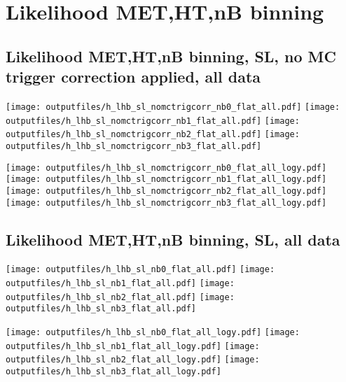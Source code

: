 \documentclass[11pt]{article}
\begin{document}




   \section{Likelihood MET,HT,nB binning}
    \subsection{ Likelihood MET,HT,nB binning, SL, no MC trigger correction applied, all data}

    \noindent
     \texttt{[image: outputfiles/h\_lhb\_sl\_nomctrigcorr\_nb0\_flat\_all.pdf]}
     \texttt{[image: outputfiles/h\_lhb\_sl\_nomctrigcorr\_nb1\_flat\_all.pdf]}
     \texttt{[image: outputfiles/h\_lhb\_sl\_nomctrigcorr\_nb2\_flat\_all.pdf]}
     \texttt{[image: outputfiles/h\_lhb\_sl\_nomctrigcorr\_nb3\_flat\_all.pdf]}

    \noindent
     \texttt{[image: outputfiles/h\_lhb\_sl\_nomctrigcorr\_nb0\_flat\_all\_logy.pdf]}
     \texttt{[image: outputfiles/h\_lhb\_sl\_nomctrigcorr\_nb1\_flat\_all\_logy.pdf]}
     \texttt{[image: outputfiles/h\_lhb\_sl\_nomctrigcorr\_nb2\_flat\_all\_logy.pdf]}
     \texttt{[image: outputfiles/h\_lhb\_sl\_nomctrigcorr\_nb3\_flat\_all\_logy.pdf]}

    \clearpage

    \subsection{ Likelihood MET,HT,nB binning, SL, all data}

    \noindent
     \texttt{[image: outputfiles/h\_lhb\_sl\_nb0\_flat\_all.pdf]}
     \texttt{[image: outputfiles/h\_lhb\_sl\_nb1\_flat\_all.pdf]}
     \texttt{[image: outputfiles/h\_lhb\_sl\_nb2\_flat\_all.pdf]}
     \texttt{[image: outputfiles/h\_lhb\_sl\_nb3\_flat\_all.pdf]}

    \noindent
     \texttt{[image: outputfiles/h\_lhb\_sl\_nb0\_flat\_all\_logy.pdf]}
     \texttt{[image: outputfiles/h\_lhb\_sl\_nb1\_flat\_all\_logy.pdf]}
     \texttt{[image: outputfiles/h\_lhb\_sl\_nb2\_flat\_all\_logy.pdf]}
     \texttt{[image: outputfiles/h\_lhb\_sl\_nb3\_flat\_all\_logy.pdf]}
\end{document}
